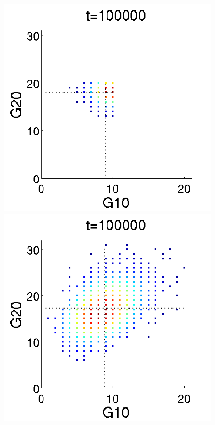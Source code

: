 \documentclass[letterpaper]{article}
\begin{document}
\begin{figure}[H]
  \begin{minipage}[b]{0.48\linewidth}
    \centering
    \includegraphics[scale=0.35]{figures/rna2_doc2_ssG10_vs_G20.png}
  \end{minipage}
  \begin{minipage}[b]{0.48\linewidth}
    \centering
    \includegraphics[scale=0.35]{figures/rna2_doc3_ssG10_vs_G20.png}

\end{minipage}
\end{figure}
\end{document}
